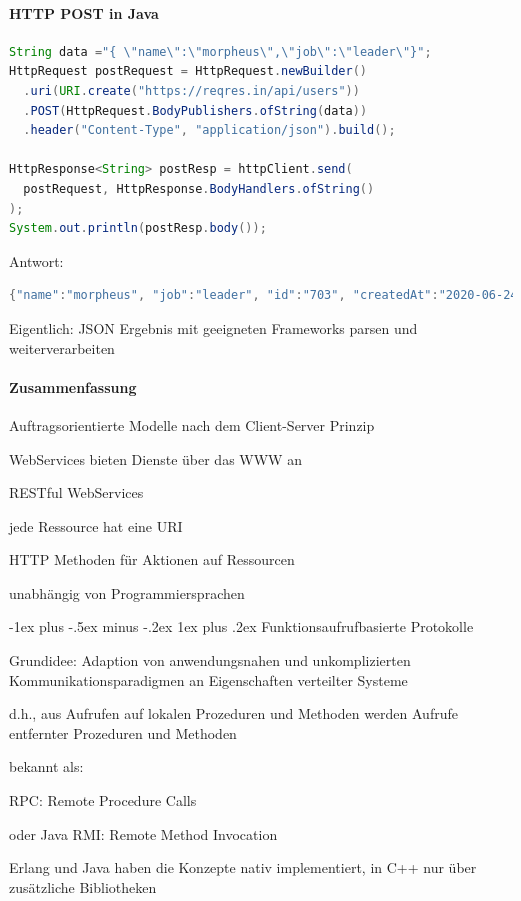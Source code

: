 \documentclass[10pt]{article}
\makeatletter
\renewcommand{\subsubsection}{\@startsection{subsubsection}{3}{0mm}%
                                {-1ex plus -.5ex minus -.2ex}%
                                {1ex plus .2ex}%
                                {\normalfont\small\bfseries}}
\makeatother
\begin{document}
  \paragraph{HTTP POST in Java}
  \begin{lstlisting}[language=java]
String data ="{ \"name\":\"morpheus\",\"job\":\"leader\"}";
HttpRequest postRequest = HttpRequest.newBuilder()
  .uri(URI.create("https://reqres.in/api/users"))
  .POST(HttpRequest.BodyPublishers.ofString(data))
  .header("Content-Type", "application/json").build();

HttpResponse<String> postResp = httpClient.send(
  postRequest, HttpResponse.BodyHandlers.ofString()
);
System.out.println(postResp.body());
\end{lstlisting}
  Antwort:
  \begin{lstlisting}[language=java]
{"name":"morpheus", "job":"leader", "id":"703", "createdAt":"2020-06-24T12:09:22.148Z"}
\end{lstlisting}
  Eigentlich: JSON Ergebnis mit geeigneten Frameworks parsen und weiterverarbeiten
  
  \paragraph{Zusammenfassung}
  
  \begin{itemize*}
    \item Auftragsorientierte Modelle nach dem Client-Server Prinzip
    \item WebServices bieten Dienste über das WWW an
    \item RESTful WebServices
    \begin{itemize*}
      \item jede Ressource hat eine URI
      \item HTTP Methoden für Aktionen auf Ressourcen
      \item unabhängig von Programmiersprachen
    \end{itemize*}
  \end{itemize*}
  
  \subsubsection{Funktionsaufrufbasierte Protokolle}
  \begin{itemize*}
    \item Grundidee: Adaption von anwendungsnahen und unkomplizierten Kommunikationsparadigmen an Eigenschaften verteilter Systeme
    \item d.h., aus Aufrufen auf lokalen Prozeduren und Methoden werden Aufrufe entfernter Prozeduren und Methoden
    \item bekannt als:
    \begin{itemize*}
      \item RPC: Remote Procedure Calls
      \item oder Java RMI: Remote Method Invocation
    \end{itemize*}
    \item Erlang und Java haben die Konzepte nativ implementiert, in C++ nur über zusätzliche Bibliotheken
  \end{itemize*}
  
\end{document}

